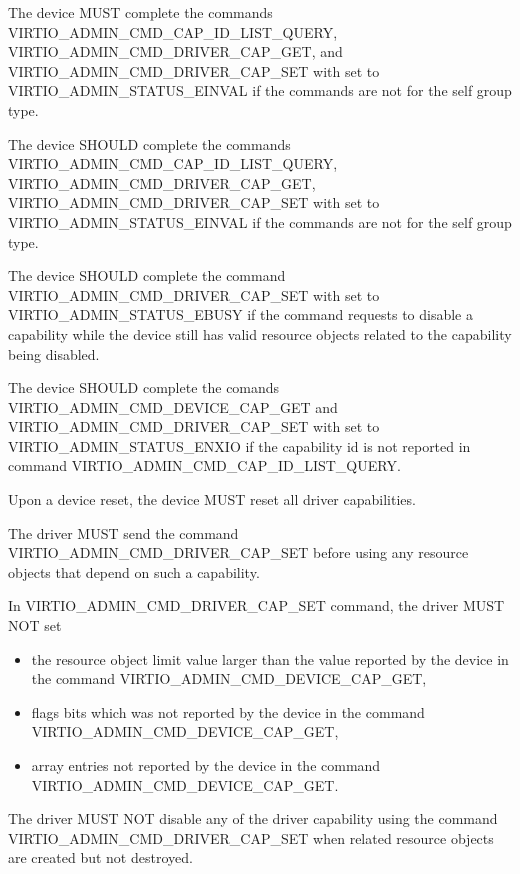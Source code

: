 The device MUST complete the commands VIRTIO_ADMIN_CMD_CAP_ID_LIST_QUERY,
VIRTIO_ADMIN_CMD_DRIVER_CAP_GET, and VIRTIO_ADMIN_CMD_DRIVER_CAP_SET
with  set to VIRTIO_ADMIN_STATUS_EINVAL if the commands are not
for the self group type.

The device SHOULD complete the commands VIRTIO_ADMIN_CMD_CAP_ID_LIST_QUERY,
VIRTIO_ADMIN_CMD_DRIVER_CAP_GET, VIRTIO_ADMIN_CMD_DRIVER_CAP_SET with
 set to VIRTIO_ADMIN_STATUS_EINVAL if the commands are not for the
self group type.

The device SHOULD complete the command VIRTIO_ADMIN_CMD_DRIVER_CAP_SET with
 set to VIRTIO_ADMIN_STATUS_EBUSY if the command requests to disable
a capability while the device still has valid resource objects related to the
capability being disabled.

The device SHOULD complete the comands VIRTIO_ADMIN_CMD_DEVICE_CAP_GET and
VIRTIO_ADMIN_CMD_DRIVER_CAP_SET with  set to
VIRTIO_ADMIN_STATUS_ENXIO if the capability id is not reported
in command VIRTIO_ADMIN_CMD_CAP_ID_LIST_QUERY.

Upon a device reset, the device MUST reset all driver capabilities.


The driver MUST send the command VIRTIO_ADMIN_CMD_DRIVER_CAP_SET before
using any resource objects that depend on such a capability.

In VIRTIO_ADMIN_CMD_DRIVER_CAP_SET command, the driver MUST NOT set
\begin{itemize}
\item the resource object limit value larger than the value reported
by the device in the command VIRTIO_ADMIN_CMD_DEVICE_CAP_GET,
\item flags bits which was not reported by the device in the command
VIRTIO_ADMIN_CMD_DEVICE_CAP_GET,
\item array entries not reported by the device in the command
VIRTIO_ADMIN_CMD_DEVICE_CAP_GET.
\end{itemize}

The driver MUST NOT disable any of the driver capability using the command
VIRTIO_ADMIN_CMD_DRIVER_CAP_SET when related resource objects
are created but not destroyed.

